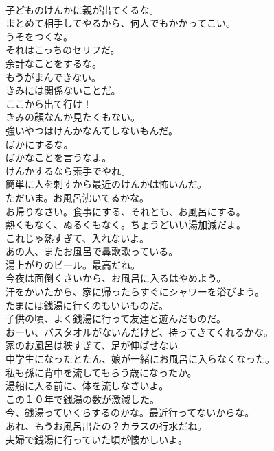\documentclass[8pt]{extreport}
\begin{document}
\begin{CJK}{UTF8}{min}
\\	子どものけんかに親が出てくるな。	
\\	まとめて相手してやるから、何人でもかかってこい。	
\\	うそをつくな。	
\\	それはこっちのセリフだ。	
\\	余計なことをするな。	
\\	もうがまんできない。	
\\	きみには関係ないことだ。	
\\	ここから出て行け！	
\\	きみの顔なんか見たくもない。	
\\	強いやつはけんかなんてしないもんだ。	
\\	ばかにするな。	
\\	ばかなことを言うなよ。	
\\	けんかするなら素手でやれ。	
\\	簡単に人を刺すから最近のけんかは怖いんだ。	
\\	ただいま。お風呂沸いてるかな。	
\\	お帰りなさい。食事にする、それとも、お風呂にする。	
\\	熱くもなく、ぬるくもなく。ちょうどいい湯加減だよ。	
\\	これじゃ熱すぎて、入れないよ。	
\\	あの人、またお風呂で鼻歌歌っている。	
\\	湯上がりのビール。最高だね。	
\\	今夜は面倒くさいから、お風呂に入るはやめよう。	
\\	汗をかいたから、家に帰ったらすぐにシャワーを浴びよう。	
\\	たまには銭湯に行くのもいいものだ。	
\\	子供の頃、よく銭湯に行って友達と遊んだものだ。	
\\	おーい、バスタオルがないんだけど、持ってきてくれるかな。	
\\	家のお風呂は狭すぎて、足が伸ばせない	
\\	中学生になったとたん、娘が一緒にお風呂に入らなくなった。	
\\	私も孫に背中を流してもらう歳になったか。	
\\	湯船に入る前に、体を流しなさいよ。	
\\	この１０年で銭湯の数が激減した。	
\\	今、銭湯っていくらするのかな。最近行ってないからな。	
\\	あれ、もうお風呂出たの？カラスの行水だね。	
\\	夫婦で銭湯に行っていた頃が懐かしいよ。	

\end{CJK}
\end{document}
